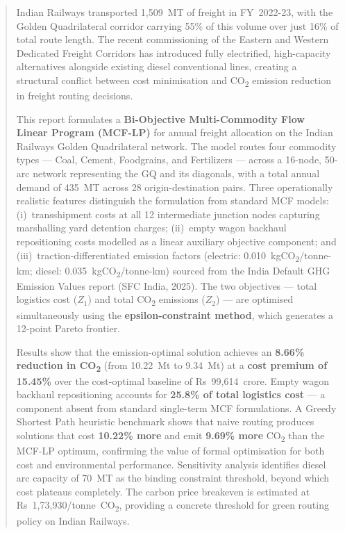 \documentclass[11pt, a4paper]{article}
\numberwithin{equation}{section}
\numberwithin{figure}{section}
\numberwithin{table}{section}
\begin{document}
\begin{abstract}
\noindent
Indian Railways transported 1,509~MT of freight in FY~2022-23, with the Golden
Quadrilateral corridor carrying 55\% of this volume over just 16\% of total route
length. The recent commissioning of the Eastern and Western Dedicated Freight Corridors
has introduced fully electrified, high-capacity alternatives alongside existing diesel
conventional lines, creating a structural conflict between cost minimisation and
CO\textsubscript{2} emission reduction in freight routing decisions.

This report formulates a \textbf{Bi-Objective Multi-Commodity Flow Linear Program
(MCF-LP)} for annual freight allocation on the Indian Railways Golden Quadrilateral
network. The model routes four commodity types — Coal, Cement, Foodgrains, and
Fertilizers — across a 16-node, 50-arc network representing the GQ and its diagonals,
with a total annual demand of 435~MT across 28 origin-destination pairs. Three
operationally realistic features distinguish the formulation from standard MCF models:
(i)~transshipment costs at all 12 intermediate junction nodes capturing marshalling yard
detention charges; (ii)~empty wagon backhaul repositioning costs modelled as a linear
auxiliary objective component; and (iii)~traction-differentiated emission factors
(electric: 0.010~kgCO\textsubscript{2}/tonne-km; diesel: 0.035~kgCO\textsubscript{2}/tonne-km)
sourced from the India Default GHG Emission Values report (SFC India, 2025). The two
objectives — total logistics cost ($Z_1$) and total CO\textsubscript{2} emissions
($Z_2$) — are optimised simultaneously using the \textbf{epsilon-constraint method},
which generates a 12-point Pareto frontier.

Results show that the emission-optimal solution achieves an \textbf{8.66\% reduction
in CO\textsubscript{2}} (from 10.22~Mt to 9.34~Mt) at a \textbf{cost premium of
15.45\%} over the cost-optimal baseline of Rs~99,614~crore. Empty wagon backhaul repositioning accounts for \textbf{25.8\% of total
logistics cost} — a component absent from standard single-term MCF formulations.
A Greedy Shortest Path heuristic benchmark shows that naive routing produces solutions
that cost \textbf{10.22\% more} and emit \textbf{9.69\% more} CO\textsubscript{2} than the MCF-LP optimum, confirming
the value of formal optimisation for both cost and environmental performance. Sensitivity analysis
identifies diesel arc capacity of 70~MT as the binding constraint threshold, beyond
which cost plateaus completely. The carbon price breakeven is estimated at
Rs~1,73,930/tonne~CO\textsubscript{2}, providing a concrete threshold for green routing
policy on Indian Railways.

\end{abstract}
\end{document}
